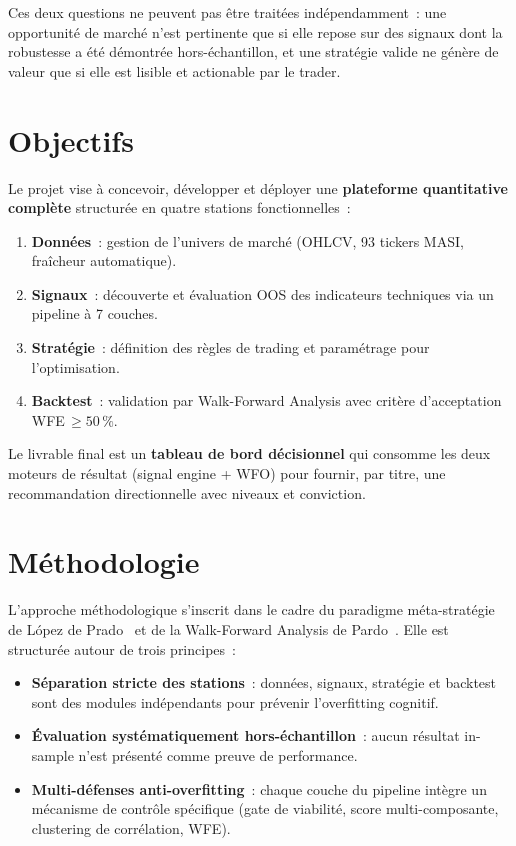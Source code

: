 Ces deux questions ne peuvent pas être traitées indépendamment~: une opportunité de
marché n'est pertinente que si elle repose sur des signaux dont la robustesse a été
démontrée hors-échantillon, et une stratégie valide ne génère de valeur que si
elle est lisible et actiona\-ble par le trader.

\section*{Objectifs}

Le projet vise à concevoir, développer et déployer une \textbf{plateforme quantitative
complète} structurée en quatre stations fonctionnelles~:

\begin{enumerate}
    \item \textbf{Données}~: gestion de l'univers de marché (OHLCV, 93 tickers MASI,
    fraîcheur automatique).
    \item \textbf{Signaux}~: découverte et évaluation OOS des indicateurs techniques
    via un pipeline à 7 couches.
    \item \textbf{Stratégie}~: définition des règles de trading et paramétrage
    pour l'optimisation.
    \item \textbf{Backtest}~: validation par Walk-Forward Analysis avec critère
    d'acceptation WFE\,$\geq 50\,\%$.
\end{enumerate}

Le livrable final est un \textbf{tableau de bord décisionnel} qui consomme les deux
moteurs de résultat (signal engine + WFO) pour fournir, par titre, une recommandation
directionnelle avec niveaux et conviction.

\section*{Méthodologie}

L'approche méthodologique s'inscrit dans le cadre du paradigme méta-stratégie de
López de Prado~\cite{lopezdeprado2018} et de la Walk-Forward Analysis de Pardo~\cite{pardo2008}.
Elle est structurée autour de trois principes~:

\begin{itemize}
    \item \textbf{Séparation stricte des stations}~: données, signaux, stratégie
    et backtest sont des modules indépendants pour prévenir l'overfitting cognitif.
    \item \textbf{Évaluation systématiquement hors-échantillon}~: aucun résultat
    in-sample n'est présenté comme preuve de performance.
    \item \textbf{Multi-défenses anti-overfitting}~: chaque couche du pipeline
    intègre un mécanisme de contrôle spécifique (gate de viabilité, score
    multi-composante, clustering de corrélation, WFE).
\end{itemize}

